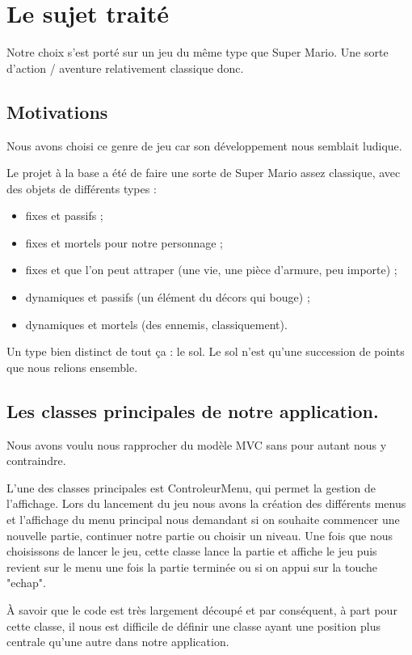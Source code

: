 \chapter{Le sujet traité}

Notre choix s'est porté sur un jeu du même type que Super Mario.
Une sorte d'action / aventure relativement classique donc.

\section{Motivations}

Nous avons choisi ce genre de jeu car son développement nous semblait ludique.

Le projet à la base a été de faire une sorte de Super Mario assez classique, avec des objets de différents types :
\begin{itemize}
	\item fixes et passifs ;
	\item fixes et mortels pour notre personnage ;
	\item fixes et que l'on peut attraper (une vie, une pièce d'armure, peu importe) ;
	\item dynamiques et passifs (un élément du décors qui bouge) ;
	\item dynamiques et mortels (des ennemis, classiquement).
\end{itemize}

Un type bien distinct de tout ça : le sol.
Le sol n'est qu'une succession de points que nous relions ensemble.


\section{Les classes principales de notre application.}

Nous avons voulu nous rapprocher du modèle MVC sans pour autant nous y contraindre.

L'une des classes principales est ControleurMenu, qui permet la gestion de l'affichage.
Lors du lancement du jeu nous avons la création des différents menus et l'affichage du menu principal nous demandant si on souhaite commencer une nouvelle partie,
continuer notre partie ou choisir un niveau.
Une fois que nous choisissons de lancer le jeu, cette classe lance la partie et affiche le jeu puis revient sur le menu une fois la partie terminée ou si on appui sur la touche "echap".

À savoir que le code est très largement découpé et par conséquent, 
à part pour cette classe, 
il nous est difficile de définir une classe ayant une position plus centrale qu'une autre dans notre application.

